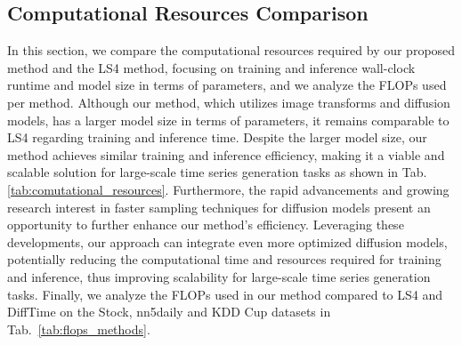 \documentclass{article}
\begin{document}
\subsection{Computational Resources Comparison}
\label{app:comp_analysis}

In this section, we compare the computational resources required by our proposed method and the LS4 method, focusing on training and inference wall-clock runtime and model size in terms of parameters, and we analyze the FLOPs used per method. Although our method, which utilizes image transforms and diffusion models, has a larger model size in terms of parameters, it remains comparable to LS4 regarding training and inference time. Despite the larger model size, our method achieves similar training and inference efficiency, making it a viable and scalable solution for large-scale time series generation tasks as shown in Tab.\ref{tab:comutational_resources}. Furthermore, the rapid advancements and growing research interest in faster sampling techniques for diffusion models \cite{song2024improved} present an opportunity to further enhance our method's efficiency. Leveraging these developments, our approach can integrate even more optimized diffusion models, potentially reducing the computational time and resources required for training and inference, thus improving scalability for large-scale time series generation tasks. Finally, we analyze the FLOPs used in our method compared to LS4 and DiffTime on the Stock, nn5daily and KDD Cup datasets in Tab.~\ref{tab:flops_methods}.

\begin{table}[!ht]
    \centering
    \caption{Computational resources in terms of training wall-clock runtime (WCR) in minutes(m) or hours(h), and model parameters (MP) in millions (M)}
    \label{tab:comutational_resources}
\end{table}
\end{document}
